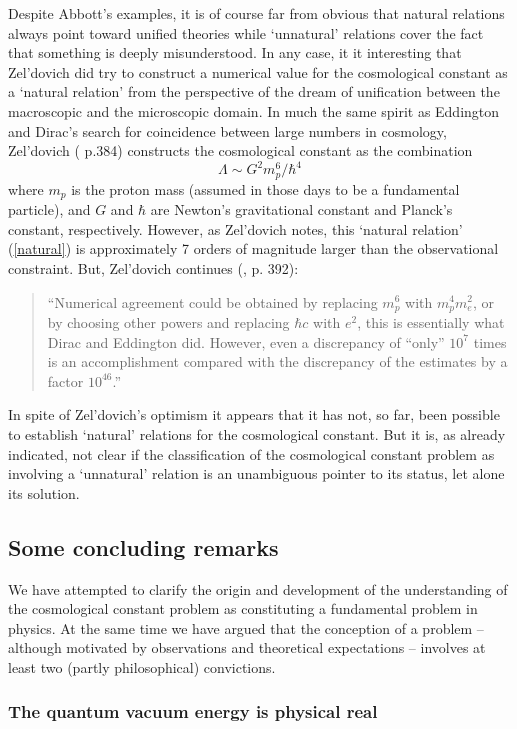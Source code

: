 \documentclass[12pt]{article}
\newcommand{\beq}{\begin{equation}}
\newcommand{\eeq}{\end{equation}}
\def\ss{\subsection}
\def\sss{\subsubsection}
\begin{document}
Despite Abbott's examples, it is of course far from obvious that
natural relations always point toward unified theories while
`unnatural' relations cover the fact that something is deeply
misunderstood. In any case, it it interesting that Zel'dovich 
did try to construct a numerical value for the cosmological constant
as a `natural relation' from the perspective of the dream of
unification between the macroscopic and the microscopic domain. In
much the same spirit as Eddington and Dirac's search for
coincidence between large numbers in cosmology, Zel'dovich
(\cite{zeldovich68} p.384) constructs the cosmological constant as
the combination
\beq 
\label{natural}
\Lambda \sim G^2 m_p^6/ \hbar^4
\eeq
where $m_p$ is the proton mass (assumed in those
days to be a fundamental particle), and $G$ and $\hbar$ are
Newton's gravitational constant and Planck's constant, respectively.
However, as Zel'dovich notes, this `natural relation' (\ref{natural})
is approximately 7 orders of magnitude larger than the
observational constraint. But, Zel'dovich continues (\cite{zeldovich68}, 
p. 392):
\begin{quote}
``Numerical agreement could be obtained by replacing $m_p^6$
with $m_p^4 m_e^2$, or by choosing other
powers and replacing $\hbar c$ with $e^2$, this is
essentially what Dirac and Eddington did. However, even
a discrepancy of ``only'' $10^7$ times is an accomplishment
compared with the discrepancy of the estimates by a
factor $10^{46}$.''
\end{quote}
In spite of Zel'dovich's optimism it appears that it has not, so
far, been possible to establish `natural' relations for the
cosmological constant. But it is, as already indicated, not
clear if the classification of the cosmological constant problem
as involving a `unnatural' relation is an unambiguous pointer to
its status, let alone its solution.


\ss{Some concluding remarks} 

We have attempted to clarify the origin and development of the
understanding of the cosmological constant problem as constituting a
fundamental problem in physics. At the same time we have argued that
the conception of a problem -- although motivated by observations and
theoretical expectations -- involves at least two (partly
philosophical) convictions.

\sss{The quantum vacuum energy is physical real}
\end{document}
